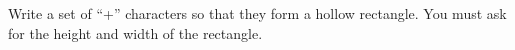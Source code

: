 \question[0]  Write a set of ``+'' characters so that they form a hollow rectangle. You must ask for the height and width of the rectangle.
